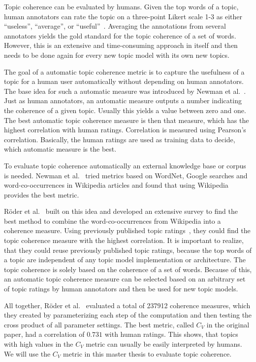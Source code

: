\documentclass[
        a4paper,
        titlepage,
        twoside,
        parskip,
        numbers=noenddot
        ]{scrbook}
\theoremstyle{break}
\begin{document}
Topic coherence can be evaluated by humans.
Given the top words of a topic, human annotators can rate the topic on a three-point Likert scale 1-3 as either ``useless'', ``average'', or ``useful''~\cite{Aletras2013}.
Averaging the annotations from several annotators yields the gold standard for the topic coherence of a set of words.
However, this is an extensive and time-consuming approach in itself and then needs to be done again for every new topic model with its own new topics.

The goal of a automatic topic coherence metric is to capture the usefulness of a topic for a human user automatically without depending on human annotators.
The base idea for such a automatic measure was introduced by Newman et al.~\cite{Newman2010}.
Just as human annotators, an automatic measure outputs a number indicating the coherence of a given topic.
Usually this yields a value between zero and one.
The best automatic topic coherence measure is then that measure, which has the highest correlation with human ratings.
Correlation is measured using Pearson's correlation.
Basically, the human ratings are used as training data to decide, which automatic measure is the best.

To evaluate topic coherence automatically an external knowledge base or corpus is needed.
Newman et al.~\cite{Newman2010} tried metrics based on WordNet, Google searches and word-co-occurrences in Wikipedia articles and found that using Wikipedia provides the best metric.

Röder et al.~\cite{Roder2015} built on this idea and developed an extensive survey to find the best method to combine the word-co-occurrences from Wikipedia into a coherence measure.
Using previously published topic ratings~\cite{Aletras2013,Chang2009,Newman2010,Rosner2013}, they could find the topic coherence measure with the highest correlation.
It is important to realize, that they could reuse previously published topic ratings, because the top words of a topic are independent of any topic model implementation or architecture.
The topic coherence is solely based on the coherence of a set of words.
Because of this, an automatic topic coherence measure can be selected based on an arbitrary set of topic ratings by human annotators and then be used for new topic models.

All together, Röder et al.~\cite{Roder2015} evaluated a total of 237912 coherence measures, which they created by parameterizing each step of the computation and then testing the cross product of all parameter settings.
The best metric, called $C_V$ in the original paper, had a correlation of $0.731$ with human ratings.
This shows, that topics with high values in the $C_V$ metric can usually be easily interpreted by humans.
We will use the $C_V$ metric in this master thesis to evaluate topic coherence.
\end{document}
